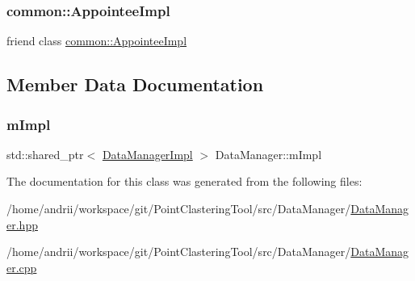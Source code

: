 \subsubsection{\texorpdfstring{common\+::\+Appointee\+Impl}{common::AppointeeImpl}}
{\footnotesize\ttfamily friend class \mbox{\hyperlink{classcommon_1_1AppointeeImpl}{common\+::\+Appointee\+Impl}}\hspace{0.3cm}{\ttfamily [friend]}}



\subsection{Member Data Documentation}
\mbox{\label{classDataManager_a3ff21b9e53039b8e8a3ebc953eaca2f8}} 
\subsubsection{\texorpdfstring{m\+Impl}{mImpl}}
{\footnotesize\ttfamily std\+::shared\+\_\+ptr$<$ \mbox{\hyperlink{classDataManagerImpl}{Data\+Manager\+Impl}} $>$ Data\+Manager\+::m\+Impl\hspace{0.3cm}{\ttfamily [private]}}



The documentation for this class was generated from the following files\+:\begin{DoxyCompactItemize}
\item 
/home/andrii/workspace/git/\+Point\+Clastering\+Tool/src/\+Data\+Manager/\mbox{\hyperlink{DataManager_8hpp}{Data\+Manager.\+hpp}}\item 
/home/andrii/workspace/git/\+Point\+Clastering\+Tool/src/\+Data\+Manager/\mbox{\hyperlink{DataManager_8cpp}{Data\+Manager.\+cpp}}\end{DoxyCompactItemize}
